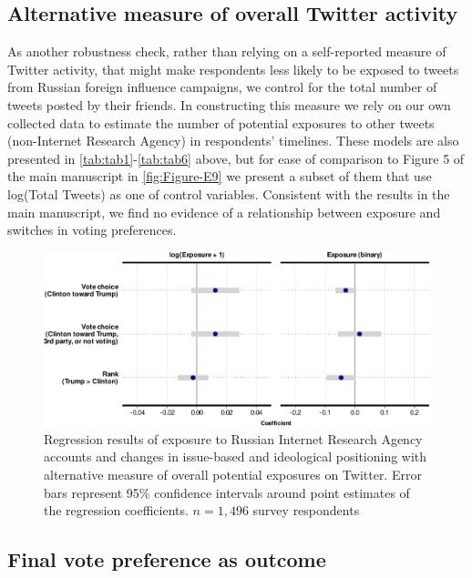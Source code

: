 \documentclass[
  12pt,
]{article}
\begin{document}
\clearpage

\hypertarget{alternative-measure-of-overall-twitter-activity}{%
\subsection{Alternative measure of overall Twitter activity}\label{alternative-measure-of-overall-twitter-activity}}

As another robustness check, rather than relying on a self-reported measure of Twitter activity, that might make respondents less likely to be exposed to tweets from Russian foreign influence campaigns, we control for the total number of tweets posted by their friends. In constructing this measure we rely on our own collected data to estimate the number of potential exposures to other tweets (non-Internet Research Agency) in respondents' timelines. These models are also presented in \ref{tab:tab1}-\ref{tab:tab6} above, but for ease of comparison to Figure 5 of the main manuscript in \autoref{fig:Figure-E9} we present a subset of them that use log(Total Tweets) as one of control variables. Consistent with the results in the main manuscript, we find no evidence of a relationship between exposure and switches in voting preferences.

\begin{figure}
\centering
\includegraphics{Appendix_files/figure-latex/Figure-E9-1.pdf}
\caption{\label{fig:Figure-E9}Regression results of exposure to Russian Internet Research Agency accounts and changes in issue-based and ideological positioning with alternative measure of overall potential exposures on Twitter. Error bars represent 95\% confidence intervals around point estimates of the regression coefficients. \(n = 1,496\) survey respondents}
\end{figure}

\clearpage

\hypertarget{final-vote-preference-as-outcome}{%
\subsection{Final vote preference as outcome}\label{final-vote-preference-as-outcome}}
\end{document}
